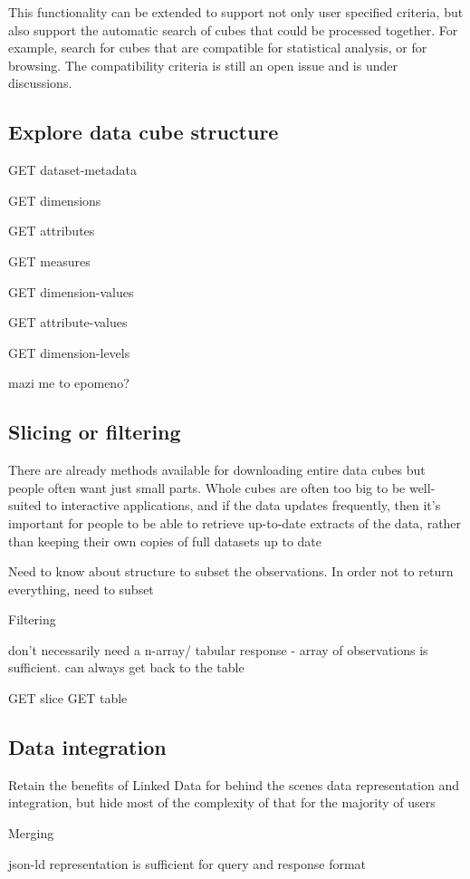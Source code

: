 \documentclass{llncs}
\begin{document}
This functionality can be extended to support not only user specified criteria, but also support the automatic search of cubes that could be processed together. For example, search for cubes that are compatible for statistical analysis, or for browsing. The compatibility criteria is still an open issue and is under discussions.

\subsection{Explore data cube structure}
GET dataset-metadata

GET dimensions

GET attributes

GET measures

GET dimension-values

GET attribute-values

GET dimension-levels

mazi me to epomeno?


\subsection{Slicing or filtering}
There are already methods available for downloading entire data cubes but people often want just small parts.  Whole cubes are often too big to be well-suited to interactive applications, and if the data updates frequently,  then it's important for people to be able to retrieve up-to-date extracts of the data, rather than keeping their own copies of full datasets up to date

Need to know about structure to subset the observations. In order not to return everything, need to subset

Filtering

don't necessarily need a n-array/ tabular response - array of observations is sufficient. can always get back to the table

GET slice
GET table


\subsection{Data integration}

Retain the benefits of Linked Data for behind the scenes data representation and integration, but hide most of the complexity of that for the majority of users

Merging 

json-ld representation is sufficient for query and response format
\end{document}
